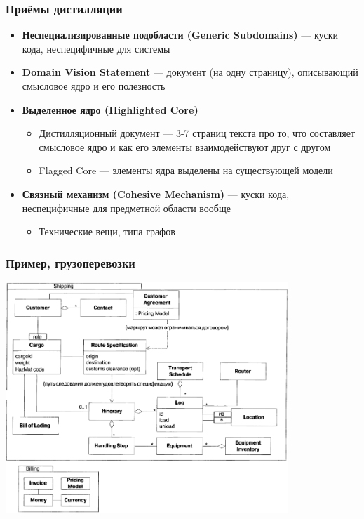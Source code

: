 \documentclass[xetex,mathserif,serif]{beamer}
\begin{document}
	\begin{frame}
		\frametitle{Приёмы дистилляции}
		\begin{itemize}
			\item \textbf{Неспециализированные подобласти (Generic Subdomains)} --- куски кода, неспецифичные для системы
			\item \textbf{Domain Vision Statement} --- документ (на одну страницу), описывающий смысловое ядро и его полезность
			\item \textbf{Выделенное ядро (Highlighted Core)}
			\begin{itemize}
				\item Дистилляционный документ --- 3-7 страниц текста про то, что составляет смысловое ядро и как его элементы взаимодействуют друг с другом
				\item Flagged Core --- элементы ядра выделены на существующей модели
			\end{itemize}
			\item \textbf{Связный механизм (Cohesive Mechanism)} --- куски кода, неспецифичные для предметной области вообще 
			\begin{itemize}
				\item Технические вещи, типа графов
			\end{itemize}
		\end{itemize}
	\end{frame}

	\begin{frame}
		\frametitle{Пример, грузоперевозки}
		\begin{center}
			\includegraphics[width=0.8\textwidth]{shippingRaw.png}
		\end{center}
	\end{frame}
\end{document}
